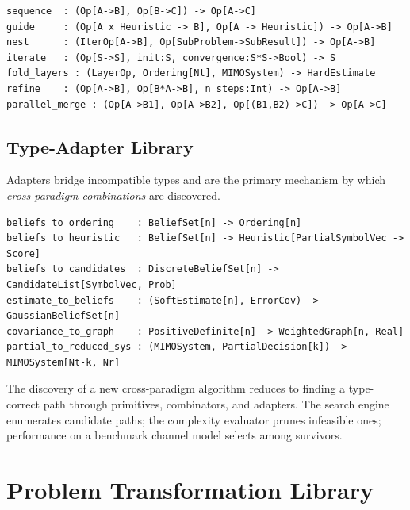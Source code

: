 \documentclass[12pt,a4paper]{article}
\begin{document}
\vspace{0.3em}
\begin{lstlisting}[style=dsl, caption={Core combinator signatures}]
sequence  : (Op[A->B], Op[B->C]) -> Op[A->C]
guide     : (Op[A x Heuristic -> B], Op[A -> Heuristic]) -> Op[A->B]
nest      : (IterOp[A->B], Op[SubProblem->SubResult]) -> Op[A->B]
iterate   : (Op[S->S], init:S, convergence:S*S->Bool) -> S
fold_layers : (LayerOp, Ordering[Nt], MIMOSystem) -> HardEstimate
refine    : (Op[A->B], Op[B*A->B], n_steps:Int) -> Op[A->B]
parallel_merge : (Op[A->B1], Op[A->B2], Op[(B1,B2)->C]) -> Op[A->C]
\end{lstlisting}

\subsection{Type-Adapter Library}

Adapters bridge incompatible types and are the primary mechanism by which
\emph{cross-paradigm combinations} are discovered.

\vspace{0.3em}
\begin{lstlisting}[style=dsl, caption={Key adapters bridging probabilistic beliefs and search control}]
beliefs_to_ordering    : BeliefSet[n] -> Ordering[n]
beliefs_to_heuristic   : BeliefSet[n] -> Heuristic[PartialSymbolVec -> Score]
beliefs_to_candidates  : DiscreteBeliefSet[n] -> CandidateList[SymbolVec, Prob]
estimate_to_beliefs    : (SoftEstimate[n], ErrorCov) -> GaussianBeliefSet[n]
covariance_to_graph    : PositiveDefinite[n] -> WeightedGraph[n, Real]
partial_to_reduced_sys : (MIMOSystem, PartialDecision[k]) -> MIMOSystem[Nt-k, Nr]
\end{lstlisting}

\noindent
The discovery of a new cross-paradigm algorithm reduces to finding a
type-correct path through primitives, combinators, and adapters.  The
search engine enumerates candidate paths; the complexity evaluator prunes
infeasible ones; performance on a benchmark channel model selects among
survivors.

\section{Problem Transformation Library}
\label{sec:transform}
\end{document}

